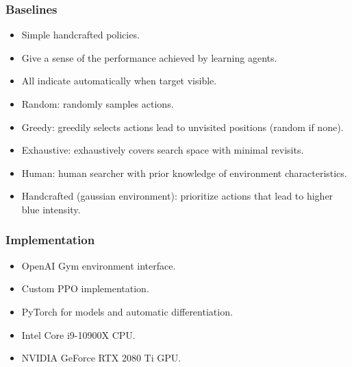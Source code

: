 \begin{frame}
    \frametitle{Baselines}

    \begin{itemize}
        \item Simple handcrafted policies.
        \item Give a sense of the performance achieved by learning agents.
        \item All indicate automatically when target visible.
    \end{itemize}

    \begin{itemize}
        \item Random: randomly samples actions.
        \item Greedy: greedily selects actions lead to unvisited positions (random if none).
        \item Exhaustive: exhaustively covers search space with minimal revisits.
        \item Human: human searcher with prior knowledge of environment characteristics.
        \item Handcrafted (gaussian environment): prioritize actions that lead to higher blue intensity.
    \end{itemize}
\end{frame}

\begin{frame}
    \frametitle{Implementation}

    \begin{itemize}
        \item OpenAI Gym environment interface.
        \item Custom PPO implementation.
        \item PyTorch for models and automatic differentiation.
        \item Intel Core i9-10900X CPU.
        \item NVIDIA GeForce RTX 2080 Ti GPU.
    \end{itemize}
\end{frame}